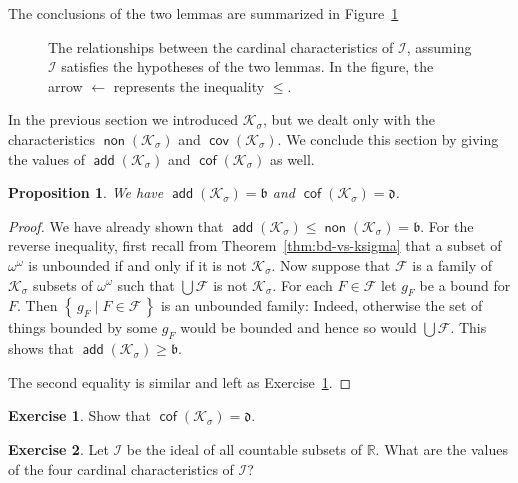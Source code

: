 \documentclass[11pt,oneside]{amsbook}
\newcommand{\set}[1]{\left\{\,#1\,\right\}}
\newcommand{\RR}{\mathbb R}
\newcommand{\Ksigma}{\mathcal K_\sigma}
\DeclareMathOperator{\add}{\mathsf{add}}
\DeclareMathOperator{\non}{\mathsf{non}}
\DeclareMathOperator{\cov}{\mathsf{cov}}
\DeclareMathOperator{\cof}{\mathsf{cof}}
\theoremstyle{definition}
\newtheorem{exerc}{Exercise}[section]
\theoremstyle{plain}
\newtheorem{prop}[thm]{Proposition}
\theoremstyle{definition}
\theoremstyle{remark}
\begin{document}
The conclusions of the two lemmas are summarized in Figure~\ref{fig:ideal}

\begin{figure}[h]
  \caption{The relationships between the cardinal characteristics of $\mathcal I$, assuming $\mathcal I$ satisfies the hypotheses of the two lemmas. In the figure, the arrow $\leftarrow$ represents the inequality $\leq$.\label{fig:ideal}}
\end{figure}

In the previous section we introduced $\Ksigma$, but we dealt only with the characteristics $\non(\Ksigma)$ and $\cov(\Ksigma)$. We conclude this section by giving the values of $\add(\Ksigma)$ and $\cof(\Ksigma)$ as well.

\begin{prop}
  We have $\add(\Ksigma)=\mathfrak b$ and $\cof(\Ksigma)=\mathfrak d$.
\end{prop}

\begin{proof}
  We have already shown that $\add(\Ksigma)\leq\non(\Ksigma)=\mathfrak b$. For the reverse inequality, first recall from Theorem~\ref{thm:bd-vs-ksigma} that a subset of $\omega^\omega$ is unbounded if and only if it is not $\Ksigma$. Now suppose that $\mathcal F$ is a family of $\Ksigma$ subsets of $\omega^\omega$ such that $\bigcup\mathcal F$ is not $\Ksigma$. For each $F\in\mathcal F$ let $g_F$ be a bound for $F$. Then $\set{g_F\mid F\in\mathcal F}$ is an unbounded family: Indeed, otherwise the set of things bounded by some $g_F$ would be bounded and hence so would $\bigcup\mathcal F$. This shows that $\add(\Ksigma)\geq\mathfrak b$.

The second equality is similar and left as Exercise~\ref{exerc:non-ksigma-d}.
\end{proof}

\begin{exerc}
  \label{exerc:non-ksigma-d}
  Show that $\cof(\Ksigma)=\mathfrak d$.
\end{exerc}

\begin{exerc}
  Let $\mathcal I$ be the ideal of all countable subsets of $\RR$. What are the values of the four cardinal characteristics of $\mathcal I$?
\end{exerc}
\end{document}
